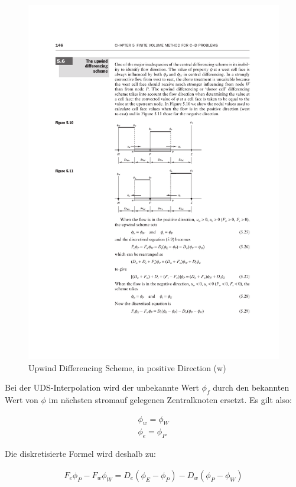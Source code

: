 \documentclass[a4paper]{scrartcl}
\begin{document}
\begin{figure}[h]
\begin{center}
\includegraphics[scale=1.2]{images/52.pdf}
\caption{Upwind Differencing Scheme, in positive Direction (w)}
\label{fig:52}
\end{center}
\end{figure}
Bei der UDS-Interpolation wird der unbekannte Wert $\phi_f$ durch den bekannten
Wert von $\phi$ im nächsten stromauf gelegenen Zentralknoten ersetzt.
Es gilt also:

\begin{align}
\phi_w = \phi_W \\
\phi_e = \phi_P
\end{align}

Die diskretisierte Formel wird deshalb zu:

\begin{align}
\boxed{F_e \phi_P-F_w \phi_W = D_e(\phi_E - \phi_P) - D_w(\phi_P - \phi_W)}
\end{align}
\end{document}

